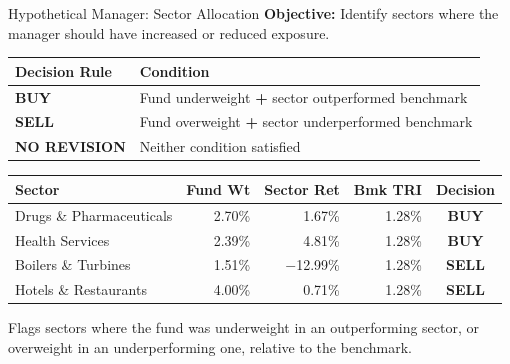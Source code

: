 \documentclass[11pt, aspectratio=43]{beamer}
\begin{document}
\begin{frame}{Hypothetical Manager: Sector Allocation}
\textbf{Objective:} Identify sectors where the manager should have increased or reduced exposure.

\vspace{0.4em}
\centering
\footnotesize
\begin{tabular}{l l}
\toprule
\textbf{Decision Rule} & \textbf{Condition} \\
\midrule
\textcolor{posgreen}{\textbf{BUY}} & Fund underweight \textbf{+} sector outperformed benchmark \\
\textcolor{negred}{\textbf{SELL}} & Fund overweight \textbf{+} sector underperformed benchmark \\
\textbf{NO REVISION} & Neither condition satisfied \\
\bottomrule
\end{tabular}

\vspace{0.8em}
\begin{tabular}{l r r r c}
\toprule
\textbf{Sector} & \textbf{Fund Wt} & \textbf{Sector Ret} & \textbf{Bmk TRI} & \textbf{Decision} \\
\midrule
Drugs \& Pharmaceuticals & 2.70\% & 1.67\% & 1.28\% & \textcolor{posgreen}{\textbf{BUY}} \\
Health Services & 2.39\% & 4.81\% & 1.28\% & \textcolor{posgreen}{\textbf{BUY}} \\
Boilers \& Turbines & 1.51\% & $-$12.99\% & 1.28\% & \textcolor{negred}{\textbf{SELL}} \\
Hotels \& Restaurants & 4.00\% & 0.71\% & 1.28\% & \textcolor{negred}{\textbf{SELL}} \\
\bottomrule
\end{tabular}

\vspace{0.6em}
\footnotesize
Flags sectors where the fund was underweight in an outperforming sector, or overweight in an underperforming one, relative to the benchmark.
\end{frame}
\end{document}
